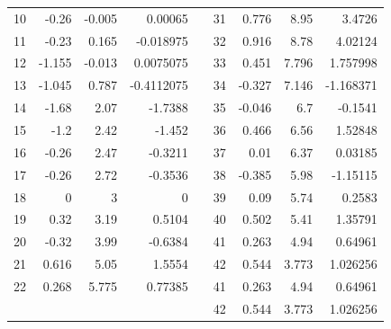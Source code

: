 \documentclass[12pt]{article}
\begin{document}
\begin{table}[H]
{\begin{tabular}{rrrrl|r|r|r|r|}
\multicolumn{1}{|r|}{10} & \multicolumn{1}{r|}{-0.26} & \multicolumn{1}{r|}{-0.005} & \multicolumn{1}{r|}{0.00065} &  & 31 & 0.776 & 8.95 & 3.4726 \\ \cline{1-4} \cline{6-9} 
\multicolumn{1}{|r|}{11} & \multicolumn{1}{r|}{-0.23} & \multicolumn{1}{r|}{0.165} & \multicolumn{1}{r|}{-0.018975} &  & 32 & 0.916 & 8.78 & 4.02124 \\ \cline{1-4} \cline{6-9} 
\multicolumn{1}{|r|}{12} & \multicolumn{1}{r|}{-1.155} & \multicolumn{1}{r|}{-0.013} & \multicolumn{1}{r|}{0.0075075} &  & 33 & 0.451 & 7.796 & 1.757998 \\ \cline{1-4} \cline{6-9} 
\multicolumn{1}{|r|}{13} & \multicolumn{1}{r|}{-1.045} & \multicolumn{1}{r|}{0.787} & \multicolumn{1}{r|}{-0.4112075} &  & 34 & -0.327 & 7.146 & -1.168371 \\ \cline{1-4} \cline{6-9} 
\multicolumn{1}{|r|}{14} & \multicolumn{1}{r|}{-1.68} & \multicolumn{1}{r|}{2.07} & \multicolumn{1}{r|}{-1.7388} &  & 35 & -0.046 & 6.7 & -0.1541 \\ \cline{1-4} \cline{6-9} 
\multicolumn{1}{|r|}{15} & \multicolumn{1}{r|}{-1.2} & \multicolumn{1}{r|}{2.42} & \multicolumn{1}{r|}{-1.452} &  & 36 & 0.466 & 6.56 & 1.52848 \\ \cline{1-4} \cline{6-9} 
\multicolumn{1}{|r|}{16} & \multicolumn{1}{r|}{-0.26} & \multicolumn{1}{r|}{2.47} & \multicolumn{1}{r|}{-0.3211} &  & 37 & 0.01 & 6.37 & 0.03185 \\ \cline{1-4} \cline{6-9} 
\multicolumn{1}{|r|}{17} & \multicolumn{1}{r|}{-0.26} & \multicolumn{1}{r|}{2.72} & \multicolumn{1}{r|}{-0.3536} &  & 38 & -0.385 & 5.98 & -1.15115 \\ \cline{1-4} \cline{6-9} 
\multicolumn{1}{|r|}{18} & \multicolumn{1}{r|}{0} & \multicolumn{1}{r|}{3} & \multicolumn{1}{r|}{0} &  & 39 & 0.09 & 5.74 & 0.2583 \\ \cline{1-4} \cline{6-9} 
\multicolumn{1}{|r|}{19} & \multicolumn{1}{r|}{0.32} & \multicolumn{1}{r|}{3.19} & \multicolumn{1}{r|}{0.5104} &  & 40 & 0.502 & 5.41 & 1.35791 \\ \cline{1-4} \cline{6-9} 
\multicolumn{1}{|r|}{20} & \multicolumn{1}{r|}{-0.32} & \multicolumn{1}{r|}{3.99} & \multicolumn{1}{r|}{-0.6384} &  & 41 & 0.263 & 4.94 & 0.64961 \\ \cline{1-4} \cline{6-9} 
\multicolumn{1}{|r|}{21} & \multicolumn{1}{r|}{0.616} & \multicolumn{1}{r|}{5.05} & \multicolumn{1}{r|}{1.5554} &  & 42 & 0.544 & 3.773 & 1.026256 \\ \cline{1-4} \cline{6-9} 
\multicolumn{1}{|r|}{22} & \multicolumn{1}{r|}{0.268} & \multicolumn{1}{r|}{5.775} & \multicolumn{1}{r|}{0.77385} &  & 41 & 0.263 & 4.94 & 0.64961 \\ \cline{1-4} \cline{6-9} 
\multicolumn{1}{l}{} & \multicolumn{1}{l}{} & \multicolumn{1}{l}{} & \multicolumn{1}{l}{} &  & 42 & 0.544 & 3.773 & 1.026256 \\ \cline{6-9} 
\end{tabular}%
}
\end{table}
\end{document}
